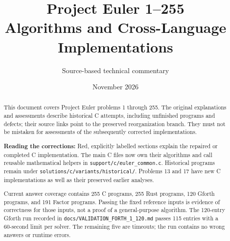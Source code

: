 \documentclass[11pt,letterpaper]{article}
\title{Project Euler 1--255\\Algorithms and Cross-Language Implementations}
\author{Source-based technical commentary}
\date{November 2026}
\begin{document}
\maketitle
\begin{abstract}
This document covers Project Euler problems 1 through 255. The original
explanations and assessments describe historical C attempts, including
unfinished programs and defects; their source links point to the preserved
reorganization branch. They must not be mistaken for assessments of the
subsequently corrected implementations.

{\color{red}\textbf{Reading the corrections:} Red, explicitly labelled
sections explain the repaired or completed C implementation. The main C
files now own their algorithms and call reusable mathematical helpers in
\texttt{support/c/euler\_common.c}. Historical programs remain under
\texttt{solutions/c/variants/historical/}. Problems 13 and 17 have new C
implementations as well as their preserved earlier analyses.}

Current answer coverage contains 255 C programs, 255 Rust programs, 120 Gforth
programs, and 191 Factor programs. Passing the fixed reference inputs is
evidence of correctness for those inputs, not a proof of a general-purpose
algorithm. The 120-entry Gforth run recorded in
\texttt{docs/VALIDATION\_FORTH\_1\_120.md} passes 115 entries with a
60-second limit per solver. The remaining five are timeouts; the run contains
no wrong answers or runtime errors.
\end{abstract}
\tableofcontents
\clearpage

\clearpage

\clearpage

\clearpage

\clearpage

\clearpage

\clearpage

\clearpage

\clearpage

\clearpage

\clearpage

\clearpage

\clearpage

\clearpage

\clearpage

\clearpage

\clearpage

\clearpage

\end{document}
